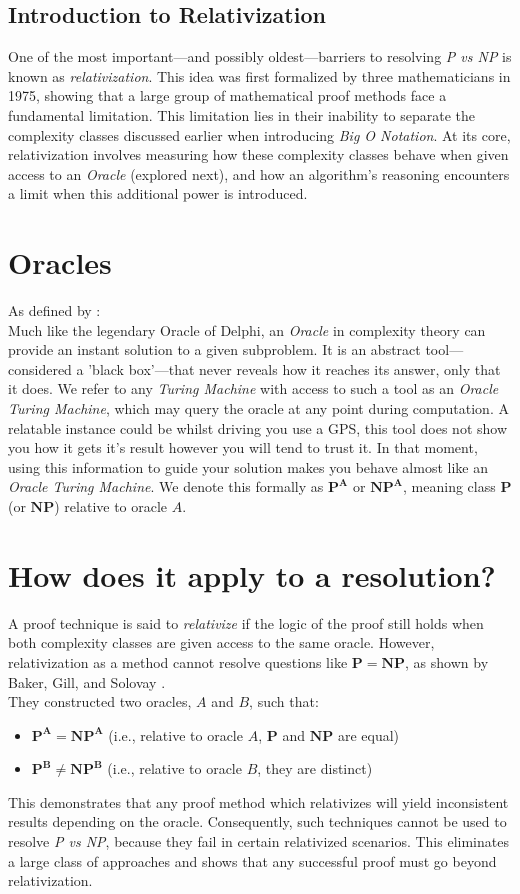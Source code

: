 \documentclass[12pt]{report}
\begin{document}
\subsection{Introduction to Relativization}
One of the most important—and possibly oldest—barriers to resolving \textit{P vs NP} is known as \textit{relativization}.
This idea was first formalized by three mathematicians in 1975, showing that a large group of mathematical proof methods face a fundamental limitation.
This limitation lies in their inability to separate the complexity classes discussed earlier when introducing \textit{Big O Notation}.
At its core, relativization involves measuring how these complexity classes behave when given access to an \textit{Oracle} (explored next), and how an algorithm's reasoning encounters a limit when this additional power is introduced.


\section{Oracles}
As defined by \cite{arora2009}:\\
Much like the legendary Oracle of Delphi, an \textit{Oracle} in complexity theory can provide an instant solution to a given subproblem.
It is an abstract tool—considered a 'black box'—that never reveals how it reaches its answer, only that it does.
We refer to any \textit{Turing Machine} with access to such a tool as an \textit{Oracle Turing Machine}, which may query the oracle at any point during computation.
A relatable instance could be whilst driving you use a GPS, this tool does not show you how it gets it's result however you will tend to trust it.
In that moment, using this information to guide your solution makes you behave almost like an \textit{Oracle Turing Machine}.
We denote this formally as $\mathbf{P^A}$ or $\mathbf{NP^A}$, meaning class $\mathbf{P}$ (or $\mathbf{NP}$) relative to oracle $A$.

\section{How does it apply to a resolution?}
A proof technique is said to \textit{relativize} if the logic of the proof still holds when both complexity classes are given access to the same oracle.
However, relativization as a method cannot resolve questions like $\mathbf{P = NP}$, as shown by Baker, Gill, and Solovay \cite{baker1975relativizations}.\\
They constructed two oracles, $A$ and $B$, such that:
\begin{itemize}
    \item $\mathbf{P^A = NP^A}$ (i.e., relative to oracle $A$, $\mathbf{P}$ and $\mathbf{NP}$ are equal)
    \item $\mathbf{P^B \neq NP^B}$ (i.e., relative to oracle $B$, they are distinct)
\end{itemize}
This demonstrates that any proof method which relativizes will yield inconsistent results depending on the oracle.
Consequently, such techniques cannot be used to resolve \textit{P vs NP}, because they fail in certain relativized scenarios.
This eliminates a large class of approaches and shows that any successful proof must go beyond relativization.
\end{document}
